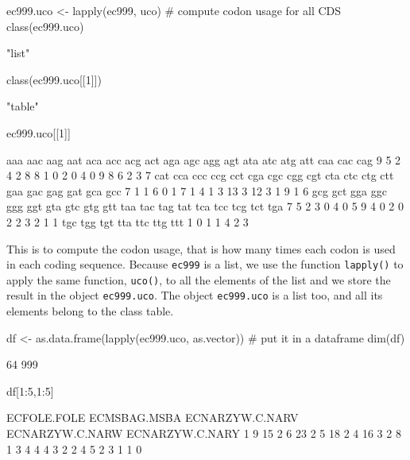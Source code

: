 \documentclass{article}
\begin{document}
\begin{Schunk}
\begin{Sinput}
 ec999.uco <- lapply(ec999, uco) # compute codon usage for all CDS
 class(ec999.uco)
\end{Sinput}
\begin{Soutput}
[1] "list"
\end{Soutput}
\begin{Sinput}
 class(ec999.uco[[1]])
\end{Sinput}
\begin{Soutput}
[1] "table"
\end{Soutput}
\begin{Sinput}
 ec999.uco[[1]]
\end{Sinput}
\begin{Soutput}
aaa aac aag aat aca acc acg act aga agc agg agt ata atc atg att caa cac cag 
  9   5   2   4   2   8   8   1   0   2   0   4   0   9   8   6   2   3   7 
cat cca ccc ccg cct cga cgc cgg cgt cta ctc ctg ctt gaa gac gag gat gca gcc 
  7   1   1   6   0   1   7   1   4   1   3  13   3  12   3   1   9   1   6 
gcg gct gga ggc ggg ggt gta gtc gtg gtt taa tac tag tat tca tcc tcg tct tga 
  7   5   2   3   0   4   0   5   9   4   0   2   0   2   2   3   2   1   1 
tgc tgg tgt tta ttc ttg ttt 
  1   0   1   1   4   2   3 
\end{Soutput}
\end{Schunk}

This is to compute the codon usage, that is how many times each codon is used
in each coding sequence. Because \texttt{ec999} is a list, we use the function
\texttt{lapply()} to apply the same function, \texttt{uco()}, to all the
elements of the list and we store the result in the object \texttt{ec999.uco}.
The object \texttt{ec999.uco} is a list too, and all its elements belong to
the class table.

\begin{Schunk}
\begin{Sinput}
 df <- as.data.frame(lapply(ec999.uco, as.vector)) # put it in a dataframe
 dim(df)
\end{Sinput}
\begin{Soutput}
[1]  64 999
\end{Soutput}
\begin{Sinput}
 df[1:5,1:5]
\end{Sinput}
\begin{Soutput}
  ECFOLE.FOLE ECMSBAG.MSBA ECNARZYW.C.NARV ECNARZYW.C.NARW ECNARZYW.C.NARY
1           9           15               2               6              23
2           5           18               2               4              16
3           2            8               1               3               4
4           4            3               2               2               4
5           2            3               1               1               0
\end{Soutput}
\end{Schunk}
\end{document}
